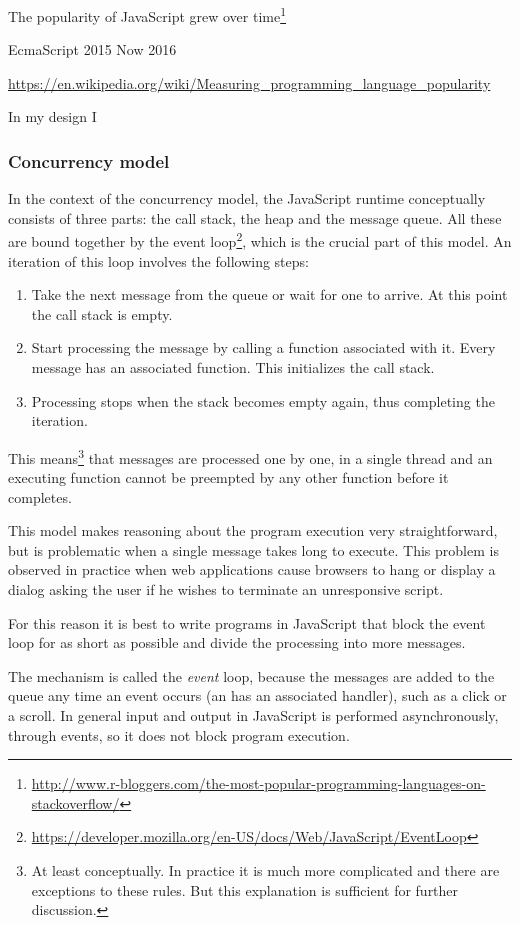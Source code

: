 The popularity of JavaScript grew over time\footnote{\url{http://www.r-bloggers.com/the-most-popular-programming-languages-on-stackoverflow/}}

EcmaScript 2015
Now 2016

\url{https://en.wikipedia.org/wiki/Measuring_programming_language_popularity}

In my design I 

\subsubsection{Concurrency model}
In the context of the concurrency model, the JavaScript runtime conceptually consists of three parts: the call stack, the heap and the message queue. All these are bound together by the event loop\footnote{\url{https://developer.mozilla.org/en-US/docs/Web/JavaScript/EventLoop}}, which is the crucial part of this model.
An iteration of this loop involves the following steps:
\begin{enumerate}
	\item Take the next message from the queue or wait for one to arrive. At this point the call stack is empty.
	\item Start processing the message by calling a function associated with it. Every message has an associated function. This initializes the call stack.
	\item Processing stops when the stack becomes empty again, thus completing the iteration.
\end{enumerate}

This means\footnote{At least conceptually. In practice it is much more complicated and there are exceptions to these rules. But this explanation is sufficient for further discussion.} that messages are processed one by one, in a single thread and an executing function cannot be preempted by any other function before it completes.

This model makes reasoning about the program execution very straightforward, but is problematic when a single message takes long to execute. This problem is observed in practice when web applications cause browsers to hang or display a dialog asking the user if he wishes to terminate an unresponsive script.

For this reason it is best to write programs in JavaScript that block the event loop for as short as possible and divide the processing into more messages.

The mechanism is called the \textit{event} loop, because the messages are added to the queue any time an event occurs (an has an associated handler), such as a click or a scroll. In general input and output in JavaScript is performed asynchronously, through events, so it does not block program execution.


